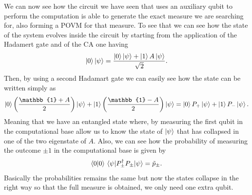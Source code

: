 {    We can now see how the circuit we have seen that uses an auxiliary qubit to perform the computation is able to generate the exact measure we are searching for, also forming a POVM for that measure. To see that we can see how the state of the system evolves inside the circuit by starting from the application of the Hadamert gate and of the CA one having
    \begin{equation}
        \ket{0}\ket{\psi} = \frac{\ket{0}\ket{\psi} + \ket{1}A\ket{\psi}}{\sqrt{2}}.
    \end{equation}
    Then, by using a second Hadamart gate we can easily see how the state can be written simply as
    \begin{equation}
        \ket{0}\left( \frac{\mathbb{1} + A}{2} \right)\ket{\psi} + \ket{1}\left( \frac{\mathbb{1} - A}{2} \right)\ket{\psi} = \ket{0}P_+\ket{\psi} + \ket{1}P_-\ket{\psi}.
    \end{equation}
    Meaning that we have an entangled state where, by measuring the first qubit in the computational base allow us to know the state of $\ket{\psi}$ that has collapsed in one of the two eigenstate of $A$. Also, we can see how the probability of measuring the outcome $\pm 1$ in the computational base is given by
    \begin{equation}
        \braket{0}\ev{P_\pm^\dagger P_\pm}{\psi} = \tilde{p}_\pm.
    \end{equation}
    Basically the probabilities remains the same but now the states collapse in the right way so that the full measure is obtained, we only need one extra qubit.
}